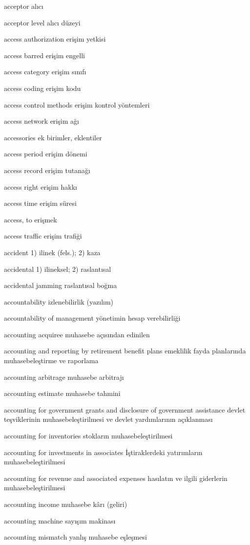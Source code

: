 \documentclass[12pt,fleqn]{article}\usepackage{../../common}
\begin{document}
acceptor alıcı

acceptor level alıcı düzeyi

access authorization erişim yetkisi

access barred erişim engelli

access category erişim sınıfı

access coding erişim kodu

access control methods erişim kontrol yöntemleri

access network erişim ağı

accessories ek birimler, eklentiler

access period erişim dönemi

access record erişim tutanağı

access right erişim hakkı

access time erişim süresi

access, to erişmek

access traffic erişim trafiği

accident 1) ilinek (fels.); 2) kaza

accidental 1) ilineksel; 2) raslantısal

accidental jamming raslantısal boğma

accountability izlenebilirlik (yazılım)

accountability of management yönetimin hesap verebilirliği

accounting acquiree muhasebe açısından edinilen

accounting and reporting by retirement benefit plans emeklilik fayda planlarında muhasebeleştirme ve raporlama

accounting arbitrage muhasebe arbitrajı

accounting estimate muhasebe tahmini

accounting for government grants and disclosure of government assistance devlet teşviklerinin muhasebeleştirilmesi ve devlet yardımlarının açıklanması

accounting for inventories stokların muhasebeleştirilmesi

accounting for investments in associates İştiraklerdeki yatırımların muhasebeleştirilmesi

accounting for revenue and associated expenses hasılatın ve ilgili giderlerin muhasebeleştirilmesi

accounting income muhasebe kârı (geliri)

accounting machine sayışım makinası

accounting mismatch yanlış muhasebe eşleşmesi
\end{document}
